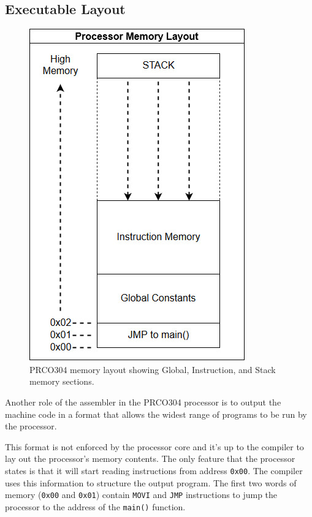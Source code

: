\documentclass[11pt,a4paper]{report}
\newcommand{\scname}{PRCO304}
\begin{document}
\subsection{Executable Layout}

\begin{figure}[H]
\begin{center}
\includegraphics[scale=0.4]{prco_memory_layout}
\end{center}
\caption{\scname{} memory layout showing Global, Instruction, and Stack memory sections.}
\label{fig:asm_mem_layout}
\end{figure}

Another role of the assembler in the \scname{} processor is to output the machine code in a format that allows the widest range of programs to be run by the processor.

This format is not enforced by the processor core and it's up to the compiler to lay out the processor's memory contents. The only feature that the processor states is that it will start reading instructions from address \verb|0x00|. The compiler uses this information to structure the output program. The first two words of memory (\verb|0x00| and \verb|0x01|) contain \verb|MOVI| and \verb|JMP| instructions to jump the processor to the address of the \verb|main()| function.
\end{document}

